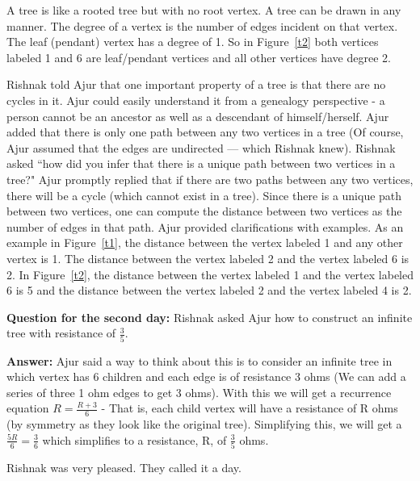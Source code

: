 A tree is like a rooted tree but with no root vertex. A tree can be drawn in any manner. The degree of a vertex is the number of edges incident on that vertex. The leaf (pendant) vertex has a degree of 1. So in Figure~\ref{t2} both vertices labeled 1 and 6 are leaf/pendant vertices and all other vertices have degree 2. 

Rishnak told Ajur that one important property of a tree is that there are no cycles in it. Ajur could easily understand it from a genealogy perspective - a person cannot be an ancestor as well as a descendant of himself/herself.  Ajur added that there is only one path between any two vertices in a tree (Of course, Ajur assumed that the edges are undirected --- which Rishnak knew). Rishnak asked ``how did you infer that there is a unique path between two vertices in a tree?" Ajur promptly replied that if there are two paths between any two vertices, there will be a cycle (which cannot exist in a tree). Since there is a unique path between two vertices, one can compute the distance between two vertices as the number of edges in that path. Ajur provided clarifications with examples.  As an example in Figure~\ref{t1}, the distance between the vertex labeled 1 and any other vertex is 1. The distance between the vertex labeled 2 and the vertex labeled 6 is 2. In Figure~\ref{t2}, the distance between the vertex labeled 1 and the vertex labeled 6 is 5 and the distance between the vertex labeled 2 and the vertex labeled 4 is 2.

\textbf{Question for the second day:} Rishnak asked Ajur how to construct an infinite tree with resistance of $\frac{3}{5}$.

\textbf{Answer:} Ajur said a way to think about this is to consider an infinite tree in which vertex has 6 children and each edge is of resistance 3 ohms (We can add a series of three 1 ohm edges to get 3 ohms).
With this we will get a recurrence equation $R=\frac{R+3}{6}$ - That is, each child vertex will have a resistance of R ohms (by symmetry as they look like the original tree). Simplifying this, we will get a $\frac{5R}{6}=\frac{3}{6}$ which simplifies to a resistance, R, of $\frac{3}{5}$ ohms.

Rishnak was very pleased. They called it a day.